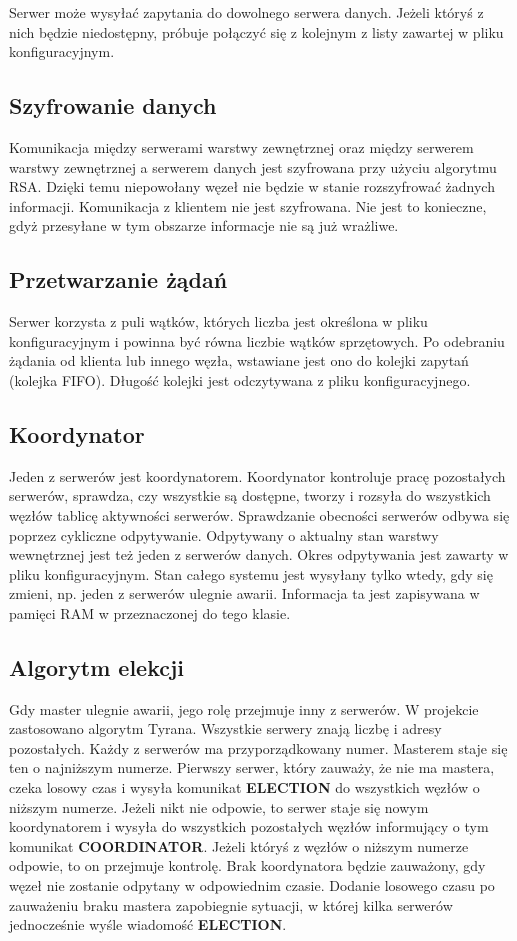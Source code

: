Serwer może wysyłać zapytania do dowolnego serwera danych. Jeżeli któryś z nich będzie niedostępny, próbuje połączyć się z kolejnym z listy zawartej w pliku konfiguracyjnym.

\subsection{Szyfrowanie danych}
Komunikacja między serwerami warstwy zewnętrznej oraz między serwerem warstwy zewnętrznej a serwerem danych jest szyfrowana przy użyciu algorytmu RSA. Dzięki temu niepowołany węzeł nie będzie w stanie rozszyfrować żadnych informacji. Komunikacja z klientem nie jest szyfrowana. Nie jest to konieczne, gdyż przesyłane w tym obszarze informacje nie są już wrażliwe.

\subsection{Przetwarzanie żądań}
Serwer korzysta z puli wątków, których liczba jest określona w pliku konfiguracyjnym i powinna być równa liczbie wątków sprzętowych. Po odebraniu żądania od klienta lub innego węzła, wstawiane jest ono do kolejki zapytań (kolejka FIFO). Długość kolejki jest odczytywana z pliku konfiguracyjnego.

\subsection{Koordynator}
Jeden z serwerów jest koordynatorem. Koordynator kontroluje pracę pozostałych serwerów, sprawdza, czy wszystkie są dostępne, tworzy i rozsyła do wszystkich węzłów tablicę aktywności serwerów. Sprawdzanie obecności serwerów odbywa się poprzez cykliczne odpytywanie. Odpytywany o aktualny stan warstwy wewnętrznej jest też jeden z serwerów danych. Okres odpytywania jest zawarty w pliku konfiguracyjnym. Stan całego systemu jest wysyłany tylko wtedy, gdy się zmieni, np. jeden z serwerów ulegnie awarii. Informacja ta jest zapisywana w pamięci RAM w przeznaczonej do tego klasie.

\subsection{Algorytm elekcji}
Gdy master ulegnie awarii, jego rolę przejmuje inny z serwerów. W projekcie zastosowano algorytm Tyrana.
Wszystkie serwery znają liczbę i adresy pozostałych. Każdy z serwerów ma przyporządkowany numer. Masterem staje się ten o najniższym numerze. Pierwszy serwer, który zauważy, że nie ma mastera, czeka losowy czas i wysyła komunikat \textbf{ELECTION} do wszystkich węzłów o niższym numerze. Jeżeli nikt nie odpowie, to serwer staje się nowym koordynatorem i wysyła do wszystkich pozostałych węzłów informujący o tym komunikat \textbf{COORDINATOR}. Jeżeli któryś z węzłów o niższym numerze odpowie, to on przejmuje kontrolę. Brak koordynatora będzie zauważony, gdy węzeł nie zostanie odpytany w odpowiednim czasie. Dodanie losowego czasu po zauważeniu braku mastera zapobiegnie sytuacji, w której kilka serwerów jednocześnie wyśle wiadomość \textbf{ELECTION}.

